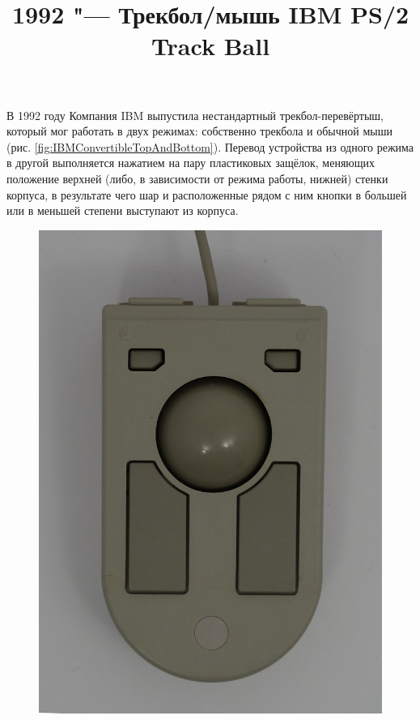 \documentclass[11pt, a4paper]{article}
\begin{document}
\title{1992 "--- Трекбол/мышь IBM PS/2 Track Ball}

\maketitle
В 1992 году Компания IBM выпустила нестандартный трекбол-перевёртыш, который мог работать в двух режимах: собственно трекбола и обычной мыши (рис. \ref{fig:IBMConvertibleTopAndBottom}). Перевод устройства из одного режима в другой выполняется нажатием на пару пластиковых защёлок, меняющих положение верхней (либо, в зависимости от режима работы, нижней) стенки корпуса, в результате чего шар и расположенные рядом с ним кнопки в большей или в меньшей степени выступают из корпуса.

\begin{figure}[h]
    \centering
    \includegraphics[scale=0.5]{1992_ibm_convertible/2.12.JPG}

\end{figure}
\end{document}

